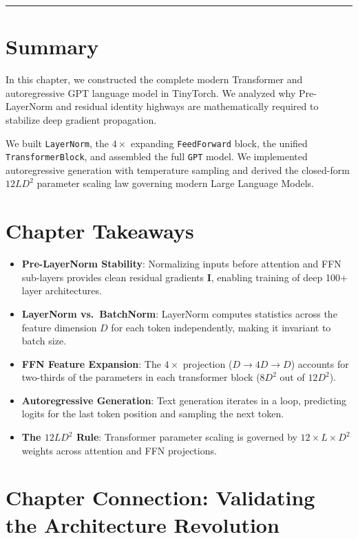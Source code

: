 \documentclass[
  letterpaper,
]{scrbook}
\providecommand{\tightlist}{%
  \setlength{\itemsep}{0pt}\setlength{\parskip}{0pt}}
\begin{document}
\begin{center}\rule{0.5\linewidth}{0.5pt}\end{center}

\section{Summary}\label{summary-13}

In this chapter, we constructed the complete modern Transformer and
autoregressive GPT language model in TinyTorch. We analyzed why
Pre-LayerNorm and residual identity highways are mathematically required
to stabilize deep gradient propagation.

We built \texttt{LayerNorm}, the \(4\times\) expanding
\texttt{FeedForward} block, the unified \texttt{TransformerBlock}, and
assembled the full \texttt{GPT} model. We implemented autoregressive
generation with temperature sampling and derived the closed-form
\(12 L D^2\) parameter scaling law governing modern Large Language
Models.

\section{Chapter Takeaways}\label{chapter-takeaways-13}

\begin{itemize}
\tightlist
\item
  \textbf{Pre-LayerNorm Stability}: Normalizing inputs before attention
  and FFN sub-layers provides clean residual gradients \(\mathbf{I}\),
  enabling training of deep 100+ layer architectures.
\item
  \textbf{LayerNorm vs.~BatchNorm}: LayerNorm computes statistics across
  the feature dimension \(D\) for each token independently, making it
  invariant to batch size.
\item
  \textbf{FFN Feature Expansion}: The \(4\times\) projection
  (\(D \to 4D \to D\)) accounts for two-thirds of the parameters in each
  transformer block (\(8 D^2\) out of \(12 D^2\)).
\item
  \textbf{Autoregressive Generation}: Text generation iterates in a
  loop, predicting logits for the last token position and sampling the
  next token.
\item
  \textbf{The \(12 L D^2\) Rule}: Transformer parameter scaling is
  governed by \(12 \times L \times D^2\) weights across attention and
  FFN projections.
\end{itemize}

\section{Chapter Connection: Validating the Architecture
Revolution}\label{chapter-connection-validating-the-architecture-revolution}
\end{document}
